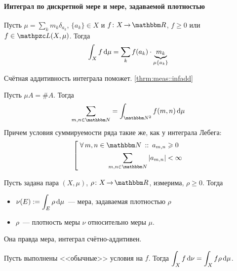 \documentclass[12pt, timbord]{longnotes}
\begin{document}
\paragraph{Интеграл по дискретной мере и мере, задаваемой плотностью}
\label{par:meas::discint}

\begin{thrm}\label{thrm:meas::discint::mol}
  Пусть $\mu = \sum_{k} m_k \delta_{a_k}$, $\{a_k\} \in X$ и  $f\colon X \to \R$, 
  $f \geqslant 0$ или $f\in \summb (X,\mu)$.
  Тогда \[
    \int_X f \, \mathrm{d} \mu = \sum_{k} f(a_k) \cdot \underbrace{m_k}_{\mu \{a_k\}}
  \]
\end{thrm}

\begin{tproof}\underdev
  Счётная аддитивность интеграла поможет. \ref{thrm:meas::infadd}
\end{tproof}


\begin{exmp}\label{exmp:meas::discint::series}
  Пусть $\mu A=\#A$. Тогда \[
    \sum_{m,n\in\N} = \int _{\N^2} f(m,n) \, \del \mu
  \]
  Причем условия суммируемости  
  ряда такие же, как у интеграла Лебега: 
  \[
    \left[\;
    \begin{split}
      \forall\, m,n\in \N \holds a_{m,n} &\geqslant 0 \\
      \sum_{m,n\in\N} |a_{m,n}| &< \infty \\
    \end{split} \right.
  \]
\end{exmp}


\begin{defn}\label{defn:meas::discint::dens}
  Пусть задана пара  
  $(X, \mu)$, $\rho \colon X \to \R$, измерима, $\rho \geqslant 0$. 
  Тогда 
  \begin{itemize}
    \item $\displaystyle \nu(E) := \int_E \rho \, \mathrm{d} \mu $~--- мера, задаваемая плотностью
      $\rho$
    \item $\rho$~--- плотность меры $\nu$ относительно меры $\mu$.
  \end{itemize}
\end{defn}

\begin{rem*}
  Она правда мера, интеграл счётно-аддитивен.
\end{rem*}

\begin{thrm}\label{thrm:meas::discint::intchg}
  Пусть выполнены <<обычные>> условия на $f$. Тогда 
  $\displaystyle \int_X f \, \mathrm{d} \nu = \int_X f \rho \, \mathrm{d} \mu$.
\end{thrm}
\end{document}
